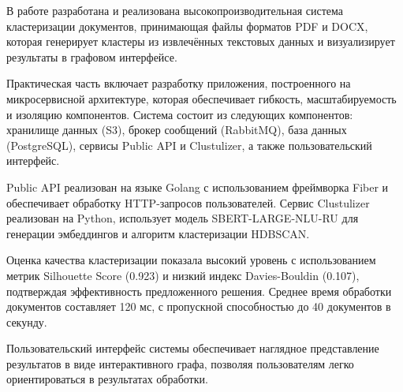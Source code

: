 \abstract %


В работе разработана и реализована высокопроизводительная система кластеризации документов, принимающая файлы форматов PDF и DOCX, которая генерирует кластеры из извлечённых текстовых данных и визуализирует результаты в графовом интерфейсе.

Практическая часть включает разработку приложения, построенного на микросервисной архитектуре, которая обеспечивает гибкость, масштабируемость и изоляцию компонентов. Система состоит из следующих компонентов: хранилище данных (S3), брокер сообщений (RabbitMQ), база данных (PostgreSQL), сервисы Public API и Clustulizer, а также пользовательский интерфейс.

Public API реализован на языке Golang с использованием фреймворка Fiber и обеспечивает обработку HTTP-запросов пользователей. Сервис Clustulizer реализован на Python, использует модель SBERT-LARGE-NLU-RU для генерации эмбеддингов и алгоритм кластеризации HDBSCAN.

Оценка качества кластеризации показала высокий уровень с использованием метрик Silhouette Score (0.923) и низкий индекс Davies-Bouldin (0.107), подтверждая эффективность предложенного решения. Среднее время обработки документов составляет 120 мс, с пропускной способностью до 40 документов в секунду.

Пользовательский интерфейс системы обеспечивает наглядное представление результатов в виде интерактивного графа, позволяя пользователям легко ориентироваться в результатах обработки.